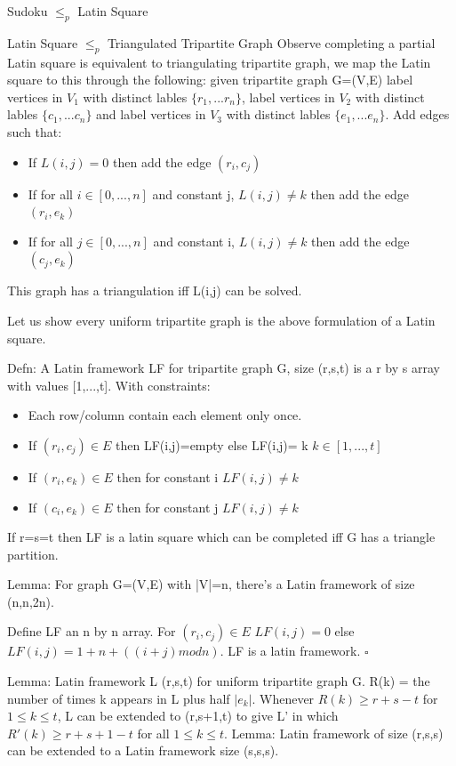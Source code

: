 \documentclass[final]{beamer}
\newlength{\colwidth}
\newcounter{row}
\newcounter{col}
\begin{document}
\begin{frame}[t]
\begin{columns}[t]
\begin{column}{\colwidth}
\begin{block}{Sudoku $\leq_p$ Latin Square}

  \end{block}
  \begin{block}{Latin Square $\leq_p$ Triangulated Tripartite Graph}
Observe completing a partial Latin square is equivalent to triangulating tripartite graph, we map the Latin square to this through the following: 
given tripartite graph G=(V,E) label vertices in $V_1$ with distinct lables $\{r_1,...r_n\}$, label vertices in $V_2$ with distinct lables $\{c_1,...c_n\}$ and label vertices in $V_3$ with distinct lables $\{e_1,...e_n\}$. Add edges such that:
\begin{itemize}
\item{If $L(i,j) = 0$ then add the edge $(r_i,c_j)$ }
\item{If for all $i \in [0,...,n]$ and constant j, $L(i,j) \neq k$ then add the edge $(r_i,e_k)$}
\item{If for all $j \in [0,...,n]$ and constant i, $L(i,j) \neq k$ then add the edge $(c_j,e_k)$}
\end{itemize}
This graph has a triangulation iff L(i,j) can be solved.

Let us show every uniform tripartite graph is the above formulation of a Latin square.

Defn: A Latin framework LF for tripartite graph G, size (r,s,t) is a r by s array with values [1,...,t]. With constraints:
\begin{itemize}
\item{Each row/column contain each element only once.}
\item{If $(r_i,c_j)\in E$ then LF(i,j)=empty else LF(i,j)= k $k\in [1,...,t]$}
\item{If $(r_i,e_k)\in E$  then for constant i $LF(i,j)\neq k$}
\item{If $(c_i,e_k)\in E$  then for constant j $LF(i,j)\neq k$}
\end{itemize}
If r=s=t then LF is a latin square which can be completed iff G has a triangle partition.

Lemma: For graph G=(V,E) with |V|=n, there's a Latin framework of size (n,n,2n).

Define LF an n by n array. For $(r_i,c_j)\in E$ $LF(i,j)=0$ else $LF(i,j)=1+n+((i+j)mod n)$. LF is a latin framework. $\square$

Lemma: Latin framework L  (r,s,t) for uniform tripartite graph G. R(k) = the number of times k appears in L plus half $|e_k|$. Whenever $R(k)\ge r+s-t$ for $1 \le k \le t$, L can be extended to (r,s+1,t) to give L' in which $R'(k)\ge r + s+1-t$ for all $1\le k \le t$.
Lemma: Latin framework of size (r,s,s) can be extended to a Latin framework size (s,s,s).


\end{block}
\end{column}
\end{columns}
\end{frame}
\end{document}
